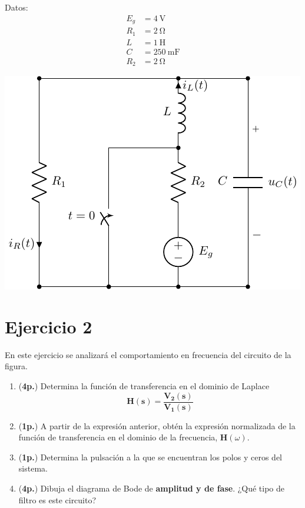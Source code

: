 \documentclass[12pt]{article}
\newcommand{\laplace}[1]{\mathbf{#1}(\mathbf{s})}
\begin{document}
\begin{minipage}{0.3\textwidth}
Datos:
\begin{align*}
  E_g &= \SI{4}{\volt}\\
  R_1&= \SI{2}{\ohm}\\
  L &= \SI{1}{\henry}\\
  C &= \SI{250}{\milli\farad}\\
  R_2 &= \SI{2}{\ohm}
\end{align*}
\end{minipage}
\begin{minipage}{0.7\textwidth}
\includegraphics{figs/E2_circuito_v2.pdf}
\end{minipage}

\section*{Ejercicio 2}

En este ejercicio se analizará el comportamiento en frecuencia del circuito de la figura.


\begin{enumerate}

\item (\textbf{4p.}) Determina la función de transferencia en el dominio de Laplace
  \[
    \laplace{H} = \frac{\laplace{V_2}}{\laplace{V_1}}
  \]
  
\item (\textbf{1p.}) A partir de la expresión anterior, obtén la expresión normalizada de la función de transferencia en el dominio de la frecuencia, $\mathbf{H}(\omega)$. 

\item (\textbf{1p.}) Determina la pulsación a la que se encuentran los polos y ceros del sistema.

\item (\textbf{4p.}) Dibuja el diagrama de Bode de \textbf{amplitud y de fase}. ¿Qué tipo de filtro es este circuito?

\end{enumerate}
\end{document}
